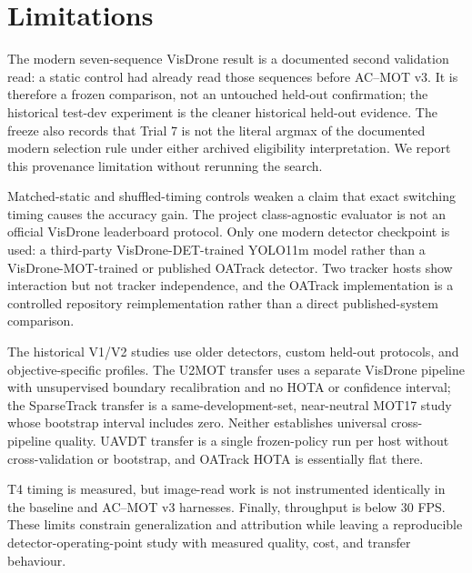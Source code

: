 \section{Limitations}
The modern seven-sequence VisDrone result is a documented second validation
read: a static control had already read those sequences before AC--MOT v3. It is
therefore a frozen comparison, not an untouched held-out confirmation; the
historical test-dev experiment is the cleaner historical held-out evidence.
The freeze also records that Trial 7 is not the literal argmax of the
documented modern selection rule under either archived eligibility
interpretation. We report this provenance limitation without rerunning the
search.

Matched-static and shuffled-timing controls weaken a claim that exact switching
timing causes the accuracy gain. The project class-agnostic evaluator is not an
official VisDrone leaderboard protocol. Only one modern detector checkpoint is
used: a third-party VisDrone-DET-trained YOLO11m model rather than a
VisDrone-MOT-trained or published OATrack detector. Two tracker hosts show
interaction but not tracker independence, and the OATrack implementation is a
controlled repository reimplementation rather than a direct published-system
comparison.

The historical V1/V2 studies use older detectors, custom held-out protocols,
and objective-specific profiles. The U2MOT transfer uses a separate VisDrone
pipeline with unsupervised boundary recalibration and no HOTA or confidence
interval; the SparseTrack transfer is a same-development-set, near-neutral
MOT17 study whose bootstrap interval includes zero. Neither establishes
universal cross-pipeline quality. UAVDT transfer is a single frozen-policy run
per host without cross-validation or bootstrap, and OATrack HOTA is essentially
flat there.

T4 timing is measured, but image-read work is not instrumented identically in
the baseline and AC--MOT v3 harnesses. Finally, throughput is below 30 FPS. These
limits constrain generalization and attribution while leaving a reproducible
detector-operating-point study with measured quality, cost, and transfer
behaviour.
